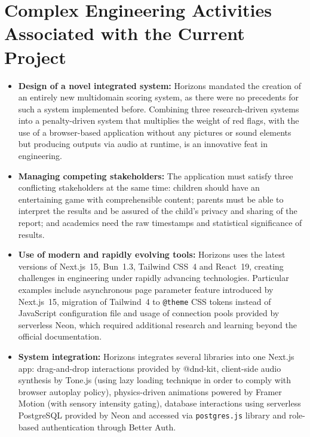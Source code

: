 \documentclass[12pt,a4paper,oneside]{report}
\begin{document}
	\section{Complex Engineering Activities Associated with the Current Project}
	
	\begin{itemize}[leftmargin=0.5in]
		\item \textbf{Design of a novel integrated system:} Horizons mandated the creation of an entirely new multidomain scoring system, as there were no precedents for such a system implemented before. Combining three research-driven systems into a penalty-driven system that multiplies the weight of red flags, with the use of a browser-based application without any pictures or sound elements but producing outputs via audio at runtime, is an innovative feat in engineering.
		
		\item \textbf{Managing competing stakeholders:} The application must satisfy three conflicting stakeholders at the same time: children should have an entertaining game with comprehensible content; parents must be able to interpret the results and be assured of the child’s privacy and sharing of the report; and academics need the raw timestamps and statistical significance of results.
		
		\item \textbf{Use of modern and rapidly evolving tools:} Horizons uses the latest versions of Next.js~15, Bun~1.3, Tailwind CSS~4 and React~19, creating challenges in engineering under rapidly advancing technologies. Particular examples include asynchronous page parameter feature introduced by Next.js~15, migration of Tailwind~4 to \texttt{@theme} CSS tokens instead of JavaScript configuration file and usage of connection pools provided by serverless Neon, which required additional research and learning beyond the official documentation.
		
		\item \textbf{System integration:} Horizons integrates several libraries into one Next.js app: drag-and-drop interactions provided by @dnd-kit, client-side audio synthesis by Tone.js (using lazy loading technique in order to comply with browser autoplay policy), physics-driven animations powered by Framer Motion (with sensory intensity gating), database interactions using serverless PostgreSQL provided by Neon and accessed via \texttt{postgres.js} library and role-based authentication through Better Auth.
	\end{itemize}
	
\end{document}
